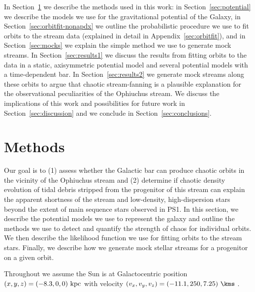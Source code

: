 In Section~\ref{sec:method} we describe the methods used in this work: in
Section~\ref{sec:potential} we describe the models we use for the gravitational
potential of the Galaxy, in Section~\ref{sec:orbitfit-nonapdx} we outline the
probabilistic procedure we use to fit orbits to the stream data (explained in
detail in Appendix~\ref{sec:orbitfit}), and in Section~\ref{sec:mocks} we
explain the simple method we use to generate mock streams. In
Section~\ref{sec:results1} we discuss the results from fitting orbits to the
data in a static, axisymmetric potential model and several potential models with
a time-dependent bar. In Section~\ref{sec:results2} we generate mock streams
along these orbits to argue that chaotic stream-fanning is a plausible
explanation for the observational peculiarities of the Ophiuchus stream. We
discuss the implications of this work and possibilities for future work in
Section~\ref{sec:discussion} and we conclude in Section~\ref{sec:conclusions}.

\section{Methods}\label{sec:method}

Our goal is to (1) assess whether the Galactic bar can produce chaotic orbits in
the vicinity of the Ophiuchus stream and (2) determine if chaotic density
evolution of tidal debris stripped from the progenitor of this stream can
explain the apparent shortness of the stream and low-density, high-dispersion
stars beyond the extent of main sequence stars observed in PS1. In this section,
we describe the potential models we use to represent the galaxy and outline the
methods we use to detect and quantify the strength of chaos for individual
orbits. We then describe the likelihood function we use for fitting orbits to
the stream stars. Finally, we describe how we generate mock stellar streams for
a progenitor on a given orbit.

Throughout we assume the Sun is at Galactocentric position $(x,y,z) =
(-8.3,0,0)~{\rm kpc}$ \citep[e.g.,][]{schoenrich12} with velocity $(v_x,v_y,v_z)
= (-11.1, 250, 7.25)~\kms$ \citep[e.g.,][]{schoenrich10, schoenrich12}.

